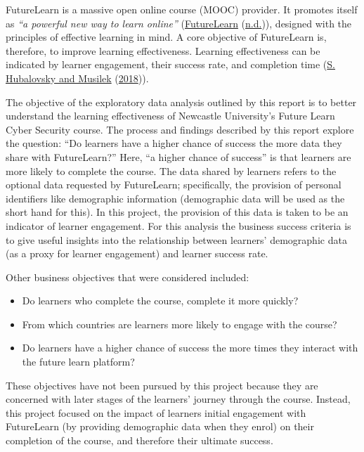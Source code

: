 \documentclass[
]{article}
\begin{document}
FutureLearn is a massive open online course (MOOC) provider. It promotes
itself as \emph{``a powerful new way to learn online''}
(\protect\hyperlink{ref-FutureLearn}{FutureLearn}
(\protect\hyperlink{ref-FutureLearn}{n.d.})), designed with the
principles of effective learning in mind. A core objective of
FutureLearn is, therefore, to improve learning effectiveness. Learning
effectiveness can be indicated by learner engagement, their success
rate, and completion time (\protect\hyperlink{ref-E-learning}{S.
Hubalovsky and Musilek} (\protect\hyperlink{ref-E-learning}{2018})).

The objective of the exploratory data analysis outlined by this report
is to better understand the learning effectiveness of Newcastle
University's Future Learn Cyber Security course. The process and
findings described by this report explore the question: ``Do learners
have a higher chance of success the more data they share with
FutureLearn?'' Here, ``a higher chance of success'' is that learners are
more likely to complete the course. The data shared by learners refers
to the optional data requested by FutureLearn; specifically, the
provision of personal identifiers like demographic information
(demographic data will be used as the short hand for this). In this
project, the provision of this data is taken to be an indicator of
learner engagement. For this analysis the business success criteria is
to give useful insights into the relationship between learners'
demographic data (as a proxy for learner engagement) and learner success
rate.

Other business objectives that were considered included:

\begin{itemize}
\item
  Do learners who complete the course, complete it more quickly?
\item
  From which countries are learners more likely to engage with the
  course?
\item
  Do learners have a higher chance of success the more times they
  interact with the future learn platform?
\end{itemize}

These objectives have not been pursued by this project because they are
concerned with later stages of the learners' journey through the course.
Instead, this project focused on the impact of learners initial
engagement with FutureLearn (by providing demographic data when they
enrol) on their completion of the course, and therefore their ultimate
success.
\end{document}
